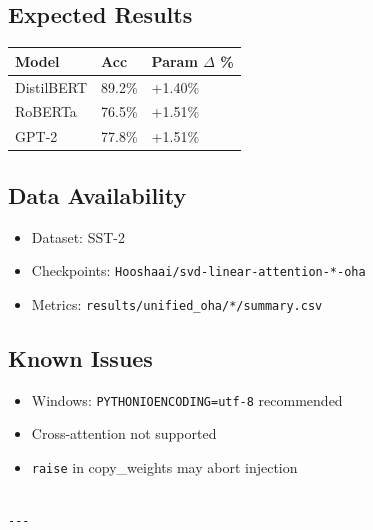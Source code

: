\subsection{Expected Results}

\begin{table}[H]
\centering
\small
\begin{tabular}{lll}
\toprule
\textbf{Model} & \textbf{Acc} & \textbf{Param $\Delta$ \%} \\
\midrule
DistilBERT & 89.2\% & +1.40\% \\
RoBERTa & 76.5\% & +1.51\% \\
GPT-2 & 77.8\% & +1.51\% \\
\bottomrule
\end{tabular}
\end{table}

\subsection{Data Availability}

\begin{itemize}
\item Dataset: SST-2
\item Checkpoints: \texttt{Hooshaai/svd-linear-attention-*-oha}
\item Metrics: \texttt{results/unified\_oha/*/summary.csv}

\end{itemize}
\subsection{Known Issues}

\begin{itemize}
\item Windows: \texttt{PYTHONIOENCODING=utf-8} recommended
\item Cross-attention not supported
\item \texttt{raise} in copy\_weights may abort injection
\end{itemize}
\begin{lstlisting}

---
\end{lstlisting}